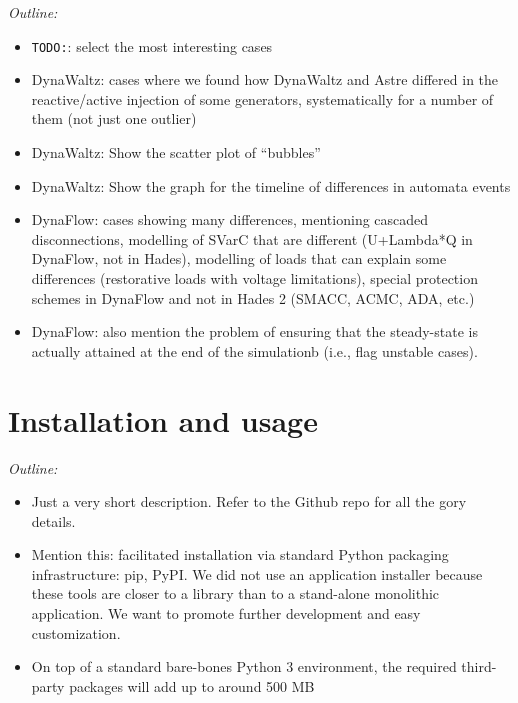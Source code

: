 \documentclass[conference]{IEEEtran}
\newcommand{\TODO}{\texttt{TODO:}\xspace}
\begin{document}
\begin{center}
  \itshape  Outline:
  \begin{itemize}
    \item \TODO: select the most interesting cases
    \item DynaWaltz: cases where we found how DynaWaltz and Astre
      differed in the reactive/active injection of some generators,
      systematically for a number of them (not just one outlier)
    \item DynaWaltz: Show the scatter plot of ``bubbles''
    \item DynaWaltz: Show the graph for the timeline of differences in automata events
    \item DynaFlow: cases showing many differences, mentioning cascaded
      disconnections, modelling of SVarC that are different (U+Lambda*Q in
      DynaFlow, not in Hades), modelling of loads that can explain some
      differences (restorative loads with voltage limitations), special
      protection schemes in DynaFlow and not in Hades 2 (SMACC, ACMC, ADA, etc.)
    \item DynaFlow: also mention the problem of ensuring that the steady-state is
      actually attained at the end of the simulationb (i.e., flag unstable cases).
  \end{itemize}
\end{center}






\section{Installation and usage}
\begin{center}
  \itshape Outline:
  \begin{itemize}
    \item Just a very short description. Refer to the Github repo for
      all the gory details.
    \item Mention this: facilitated installation via standard Python packaging
      infrastructure: pip, PyPI. We did not use an application installer because
      these tools are closer to a library than to a stand-alone monolithic
      application. We want to promote further development and easy
      customization.
    \item On top of a standard bare-bones Python 3 environment, the
          required third-party packages will add up to around 500 MB
  \end{itemize}
\end{center}
\end{document}
